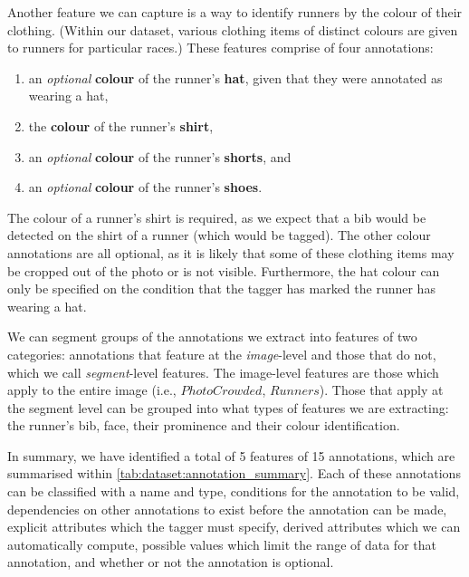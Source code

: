 Another feature we can capture is a way to identify runners by the colour of their clothing. (Within our dataset, various clothing items of distinct colours are given to runners for particular races.) These features comprise of four annotations:

\begin{enumerate}
  \item an \textit{optional} \textbf{colour} of the runner's \textbf{hat}, given that they were annotated as wearing a hat,
  \item the \textbf{colour} of the runner's \textbf{shirt},
  \item an \textit{optional} \textbf{colour} of the runner's \textbf{shorts}, and
  \item an \textit{optional} \textbf{colour} of the runner's \textbf{shoes}.
\end{enumerate}


The colour of a runner's shirt is required, as we expect that a bib would be detected on the shirt of a runner (which would be tagged). The other colour annotations are all optional, as it is likely that some of these clothing items may be cropped out of the photo or is not visible. Furthermore, the hat colour can only be specified on the condition that the tagger has marked the runner has wearing a hat.

We can segment groups of the annotations we extract into features of two categories: annotations that feature at the \textit{image}-level and those that do not, which we call \textit{segment}-level features. The image-level features are those which apply to the entire image (i.e., $PhotoCrowded$, $Runners$). Those that apply at the segment level can be grouped into what types of features we are extracting: the runner's bib, face, their prominence and their colour identification.

In summary, we have identified a total of 5 features of 15 annotations, which are summarised within \cref{tab:dataset:annotation_summary}. Each of these annotations can be classified with a name and type, conditions for the annotation to be valid, dependencies on other annotations to exist before the annotation can be made, explicit attributes which the tagger must specify, derived attributes which we can automatically compute, possible values which limit the range of data for that annotation, and whether or not the annotation is optional.



